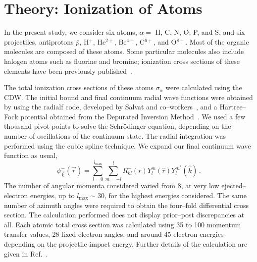 \documentclass[10pt,showpacs,showkeys,twocolumn]{revtex4}
\begin{document}
\section{Theory: Ionization of Atoms}
\label{sec:atoms}

In the present study, we consider six atoms, $\alpha=$ H, C, N, O, P, 
and S, and six projectiles, antiprotons $\bar{p}$, H$^{+}$, He$^{2+}$, 
Be$^{4+}$, C$^{6+}$, and O$^{8+}$. 
Most of the organic molecules are composed of these atoms. Some 
particular molecules also include halogen atoms such as fluorine and 
bromine; ionization cross sections of these elements have been 
previously published~\cite{miraglia2008}.

The total ionization cross sections of these atoms $\sigma_{\alpha}$
were calculated using the CDW. The initial bound and final continuum 
radial wave functions were obtained by using the {\sc radialf} code, 
developed by Salvat and co--workers~\cite{salvat1995}, and a Hartree--Fock 
potential obtained from the Depurated Inversion Method~\cite{mendez2016,mendez2018}. 
We used a few thousand pivot points to solve the Schr\"{o}dinger 
equation, depending on the number of oscillations of the continuum 
state. The radial integration was performed using the cubic spline 
technique. We expand our final continuum wave function as usual,
\begin{equation}
\psi_{\overrightarrow{k}}^{-}(\overrightarrow{r})=\sum_{l=0}^{l_{\max
}}\sum_{m=-l}^{l}R_{kl}^{-}(r)Y_{l}^{m}(\widehat{r})Y_{l}^{m^{\ast }}
(\widehat{k})\,.
\label{eq:contwave}
\end{equation}
The number of angular momenta considered varied from 8, at 
very low ejected--electron energies, up to $l_{\max}\sim 30$, 
for the highest energies 
considered. The same number of azimuth angles were required to obtain 
the four--fold differential cross section. The calculation performed does 
not display prior--post discrepancies at all. Each atomic total cross 
section was calculated using 35 to 100 momentum transfer values, 28 
fixed electron angles, and around 45 electron energies depending on the 
projectile impact energy. 
Further details of the calculation are given in Ref.~\cite{montanari2017}. 
\end{document}
